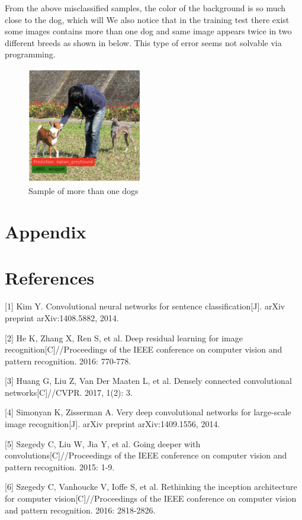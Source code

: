 \documentclass{article}
\begin{document}
From the above misclassified samples, the color of the background is so much close to the dog, which will  We also notice that in the training test there exist some images contains more than one dog and same image appears twice in two different breeds as shown in below. This type of error seems not solvable via programming. 
\begin{figure}[H]
	\centering
	\includegraphics[width=2in]{pics/two_dogs} 
	\caption{Sample of more than one dogs}
\end{figure}


\section{Appendix}


\section*{References}

\medskip

\small

[1] Kim Y. Convolutional neural networks for sentence classification[J]. arXiv preprint arXiv:1408.5882, 2014.

[2] He K, Zhang X, Ren S, et al. Deep residual learning for image recognition[C]//Proceedings of the IEEE conference on computer vision and pattern recognition. 2016: 770-778.

[3] Huang G, Liu Z, Van Der Maaten L, et al. Densely connected convolutional networks[C]//CVPR. 2017, 1(2): 3.

[4] Simonyan K, Zisserman A. Very deep convolutional networks for large-scale image recognition[J]. arXiv preprint arXiv:1409.1556, 2014.

[5] Szegedy C, Liu W, Jia Y, et al. Going deeper with convolutions[C]//Proceedings of the IEEE conference on computer vision and pattern recognition. 2015: 1-9.

[6] Szegedy C, Vanhoucke V, Ioffe S, et al. Rethinking the inception architecture for computer vision[C]//Proceedings of the IEEE conference on computer vision and pattern recognition. 2016: 2818-2826.
\end{document}
